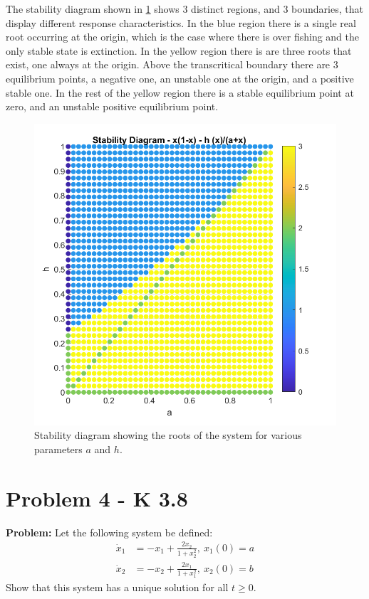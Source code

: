 \documentclass[letter]{article}
\begin{document}
The stability diagram shown in \figurename \ref{fig:pblm3} shows 3 distinct regions, and 3 boundaries, that display different response characteristics. In the blue region there is a single real root occurring at the origin, which is the case where there is over fishing and the only stable state is extinction. In the yellow region there is are three roots that exist, one always at the origin. Above the transcritical boundary there are 3 equilibrium points, a negative one, an unstable one at the origin, and a positive stable one. In the rest of the yellow region there is a stable equilibrium point at zero, and an unstable positive equilibrium point.

\begin{figure}[h]
	\centering
	\includegraphics[width=\linewidth]{fig/pblm3}
	\caption{Stability diagram showing the roots of the system for various parameters $a$ and $h$.}
	\label{fig:pblm3}
\end{figure}




\newpage
\section{Problem 4 - K 3.8}
\textbf{Problem:}
Let the following system be defined:
\begin{equation}
	\begin{aligned}
		\dot{x}_1 &= -x_1 + \frac{2 x_2}{1 + x_2^2}, \ x_1(0) = a\\
		\dot{x}_2 &= -x_2 + \frac{2 x_1}{1 + x_1^2}, \ x_2(0) = b
	\end{aligned}
\end{equation}
Show that this system has a unique solution for all $t \geq 0$.\\
\end{document}
